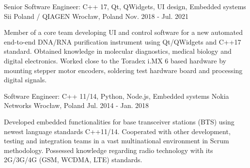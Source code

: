 \begin{cventries}
  \cventry
    {Senior Software Engineer: C++ 17, Qt, QWidgets, UI design, Embedded systems} %
    {Sii Poland / QIAGEN} %
    {Wrocław, Poland} %
    {Nov. 2018 - Jul. 2021} %
    {
        \begin{cvitems} %
            Member of a core team developing UI and control software for a new automated end-to-end DNA/RNA purification instrument using Qt/QWidgets and C++17 standard. Obtained knowledge in molecular diagnostics, medical biology and digital electronics. Worked close to the Toradex i.MX 6 based hardware by mounting stepper motor encoders, soldering test hardware board and processing digital signals.
        \end{cvitems}
    }

  \cventry
    {Software Engineer: C++ 11/14, Python, Node.js, Embedded systems} %
    {Nokia Networks} %
    {Wrocław, Poland} %
    {Jul. 2014 - Jan. 2018} %
    {
        \begin{cvitems} %
            Developed embedded functionalities for base transceiver stations (BTS) using newest language standards C++11/14. Cooperated with other development, testing and integration teams in a vast multinational environment in Scrum methodology. Possessed knowledge regarding radio technology with its 2G/3G/4G (GSM, WCDMA, LTE) standards.
        \end{cvitems}
    }

\end{cventries}
